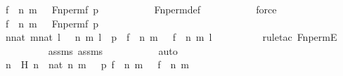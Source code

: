 \begin{isabellebody}
\ {\isachardoublequoteopen}{\isasymlangle}{\isasymlangle}f\ {\isacharbackquote}{\kern0pt}\ n{\isacharcomma}{\kern0pt}\ m{\isasymrangle}{\isacharcomma}{\kern0pt}\ {}{\isasymrangle}\ {\isasymin}\ Fn{\isacharunderscore}{\kern0pt}perm{\isacharparenleft}{\kern0pt}f{\isacharcomma}{\kern0pt}\ p{\isacharparenright}{\kern0pt}{\isachardoublequoteclose}\ \isanewline
\ \ \ \ \ \ \ \ \isamarkupfalse%
\ Fn{\isacharunderscore}{\kern0pt}perm{\isacharunderscore}{\kern0pt}def\ \isanewline
\ \ \ \ \ \ \ \ \isamarkupfalse%
\ force\ \isanewline
\ \ \ \ \isamarkupfalse%
\ \isanewline
\ \ \ \ \ \ \isamarkupfalse%
\ {\isachardoublequoteopen}{\isasymlangle}{\isasymlangle}f\ {\isacharbackquote}{\kern0pt}\ n{\isacharcomma}{\kern0pt}\ m{\isasymrangle}{\isacharcomma}{\kern0pt}\ {}{\isasymrangle}\ {\isasymin}\ Fn{\isacharunderscore}{\kern0pt}perm{\isacharparenleft}{\kern0pt}f{\isacharcomma}{\kern0pt}\ p{\isacharparenright}{\kern0pt}{\isachardoublequoteclose}\ \isanewline
\ \ \ \ \ \ \isamarkupfalse%
\ \isamarkupfalse%
\ {\isachardoublequoteopen}{\isasymexists}n{\isacharprime}{\kern0pt}{\isasymin}nat{\isachardot}{\kern0pt}\ {\isasymexists}m{\isacharprime}{\kern0pt}{\isasymin}nat{\isachardot}{\kern0pt}\ {\isasymexists}l\ {\isasymin}\ {}{\isachardot}{\kern0pt}\ {\isasymlangle}{\isasymlangle}n{\isacharprime}{\kern0pt}{\isacharcomma}{\kern0pt}\ m{\isacharprime}{\kern0pt}{\isasymrangle}{\isacharcomma}{\kern0pt}\ l{\isasymrangle}\ {\isasymin}\ p\ {\isasymand}\ {\isasymlangle}{\isasymlangle}f\ {\isacharbackquote}{\kern0pt}\ n{\isacharcomma}{\kern0pt}\ m{\isasymrangle}{\isacharcomma}{\kern0pt}\ {}{\isasymrangle}\ {\isacharequal}{\kern0pt}\ {\isasymlangle}{\isasymlangle}f\ {\isacharbackquote}{\kern0pt}\ n{\isacharprime}{\kern0pt}{\isacharcomma}{\kern0pt}\ m{\isacharprime}{\kern0pt}{\isasymrangle}{\isacharcomma}{\kern0pt}\ l{\isasymrangle}{\isachardoublequoteclose}\ \isanewline
\ \ \ \ \ \ \ \ \isamarkupfalse%
{\isacharparenleft}{\kern0pt}rule{\isacharunderscore}{\kern0pt}tac\ Fn{\isacharunderscore}{\kern0pt}permE{\isacharparenright}{\kern0pt}\isanewline
\ \ \ \ \ \ \ \ \isamarkupfalse%
\ assms{}\ assms\ \isanewline
\ \ \ \ \ \ \ \ \isamarkupfalse%
\ auto\isanewline
\ \ \ \ \ \ \isamarkupfalse%
\ \isamarkupfalse%
\ n{\isacharprime}{\kern0pt}\ \ H{\isacharcolon}{\kern0pt}\ {\isachardoublequoteopen}n{\isacharprime}{\kern0pt}\ {\isasymin}\ nat{\isachardoublequoteclose}\ {\isachardoublequoteopen}{\isasymlangle}{\isasymlangle}n{\isacharprime}{\kern0pt}{\isacharcomma}{\kern0pt}\ m{\isasymrangle}{\isacharcomma}{\kern0pt}\ {}{\isasymrangle}\ {\isasymin}\ p{\isachardoublequoteclose}\ {\isachardoublequoteopen}{\isasymlangle}{\isasymlangle}f\ {\isacharbackquote}{\kern0pt}\ n{\isacharcomma}{\kern0pt}\ m{\isasymrangle}{\isacharcomma}{\kern0pt}\ {}{\isasymrangle}\ {\isacharequal}{\kern0pt}\ {\isasymlangle}{\isasymlangle}f\ {\isacharbackquote}{\kern0pt}\ n{\isacharprime}{\kern0pt}{\isacharcomma}{\kern0pt}\ m{\isasymrangle}{\isacharcomma}{\kern0pt}\ {}{\isasymrangle}{\isachardoublequoteclose}\ \isanewline

\end{isabellebody}
